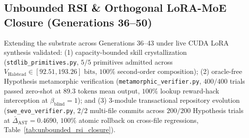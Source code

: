 \documentclass[10pt,twocolumn,letterpaper]{article}
\begin{document}
\begin{table}[htbp]
\centering
{}
\caption{Macro-Epoch 2 (Generations 31--35) Zero-Shot Bi-Level Closure Telemetry (\texttt{macro\_epoch2\_closure\_metrics.json}).}
\label{tab:macro_epoch2}
\end{table}

\subsection{Unbounded RSI \& Orthogonal LoRA-MoE Closure (Generations 36--50)}
Extending the substrate across Generations 36--43 under live CUDA LoRA synthesis validated: (1) capacity-bounded skill crystallization (\texttt{stdlib\_\allowbreak primitives.py}, $5/5$ primitives admitted across $V_{\text{Halstead}}\in[92.51, 193.26]\text{ bits}$, $100\%$ second-order composition); (2) oracle-free Hypothesis metamorphic verification (\texttt{metamorphic\_\allowbreak verifier.py}, $400/400$ trials passed zero-shot at $89.3\text{ tokens}$ mean output, $100\%$ lookup reward-hack interception at $\beta_{\text{blind}}=1$); and (3) 3-module transactional repository evolution (\texttt{swe\_\allowbreak evo\_\allowbreak verifier.py}, $2/2$ multi-file commits across $200/200$ Hypothesis trials at $\bar{\Delta}_{\text{AST}}=0.4690$, $100\%$ atomic rollback on cross-file regressions, Table~\ref{tab:unbounded_rsi_closure}).
\end{document}
